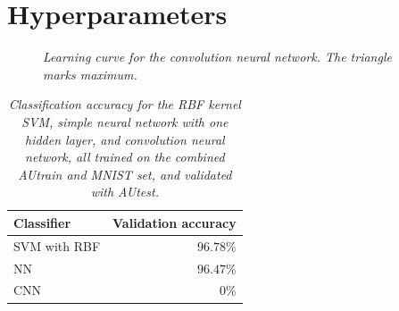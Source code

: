 \documentclass[a4paper,10pt,article,oneside,english]{memoir}
\let\oldcaption\caption
\renewcommand{\caption}[1]{\oldcaption{\emph{#1}}}
\begin{document}
	
	
	\section{Hyperparameters}
	
	
	\begin{figure}[h!]
		\centering
		\caption{Learning curve for the convolution neural network. The triangle marks maximum.}
		\label{fig:cnn_learning}
	\end{figure}
	
	\begin{table}[h!]
		\centering
		\caption{Classification accuracy for the RBF kernel SVM, simple neural network with one hidden layer, and convolution neural network, all trained on the combined AUtrain and MNIST set, and validated with AUtest. }
		\label{tab:classifier_accuracy}
		\begin{tabular}{lr}
			Classifier & Validation accuracy \\ 
			\hline 
			SVM with RBF & $96.78\%$ \\ 
			NN & $96.47\%$ \\ 
			CNN & $0\%$ \\ 
		\end{tabular} 
	\end{table}
	
	
	
	
\end{document}
